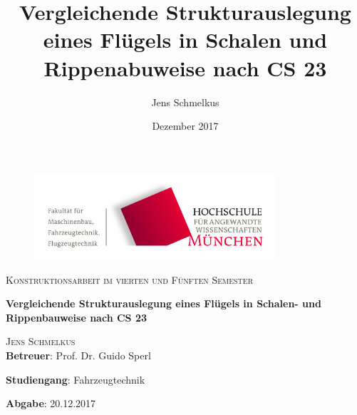 \begin{titlepage}
\setcounter{page}{1}
\begin{center}
\begin{figure}[h!]
\vspace{0cm}
\centering
\includegraphics[width=0.8\textwidth]{bilder/Logos/FK03_CMYK_Block.png}
\\[0.8cm]
\end{figure}
\vspace{1.5cm}

{\fontsize{20}{60}\scshape Konstruktionsarbeit im vierten und Fünften Semester} 
\\[1.1cm]

\begin{doublespace}
{\fontsize{30}{22}\selectfont \textbf{Vergleichende Strukturauslegung eines Flügels in Schalen- und Rippenbauweise nach CS 23}\par} 
\vspace{1.4cm}
\end{doublespace}

\title{Vergleichende Strukturauslegung eines Flügels in Schalen und Rippenabuweise nach CS 23}
\author{Jens Schmelkus}
\date{Dezember 2017}

{\fontsize{23}{60}\scshape Jens Schmelkus} 
\\[2.0cm]


\textbf{Betreuer}: Prof. Dr. Guido Sperl




\textbf{Studiengang}: Fahrzeugtechnik 

\textbf{Abgabe}: 20.12.2017

\vfill


\end{center}
\end{titlepage}
